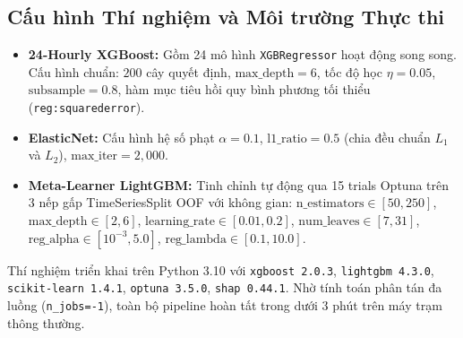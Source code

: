 \subsection{Cấu hình Thí nghiệm và Môi trường Thực thi}
\begin{itemize}
    \item \textbf{24-Hourly XGBoost:} Gồm 24 mô hình \texttt{XGBRegressor} hoạt động song song. Cấu hình chuẩn: $200$ cây quyết định, $\text{max\_depth} = 6$, tốc độ học $\eta = 0.05$, $\text{subsample} = 0.8$, hàm mục tiêu hồi quy bình phương tối thiểu (\texttt{reg:squarederror}).
    \item \textbf{ElasticNet:} Cấu hình hệ số phạt $\alpha = 0.1$, $\text{l1\_ratio} = 0.5$ (chia đều chuẩn $L_1$ và $L_2$), $\text{max\_iter} = 2,000$.
    \item \textbf{Meta-Learner LightGBM:} Tinh chỉnh tự động qua 15 trials Optuna trên 3 nếp gấp TimeSeriesSplit OOF với không gian: $\text{n\_estimators} \in [50, 250]$, $\text{max\_depth} \in [2, 6]$, $\text{learning\_rate} \in [0.01, 0.2]$, $\text{num\_leaves} \in [7, 31]$, $\text{reg\_alpha} \in [10^{-3}, 5.0]$, $\text{reg\_lambda} \in [0.1, 10.0]$.
\end{itemize}
Thí nghiệm triển khai trên Python 3.10 với \texttt{xgboost 2.0.3}, \texttt{lightgbm 4.3.0}, \texttt{scikit-learn 1.4.1}, \texttt{optuna 3.5.0}, \texttt{shap 0.44.1}. Nhờ tính toán phân tán đa luồng (\texttt{n\_jobs=-1}), toàn bộ pipeline hoàn tất trong dưới 3 phút trên máy trạm thông thường.
